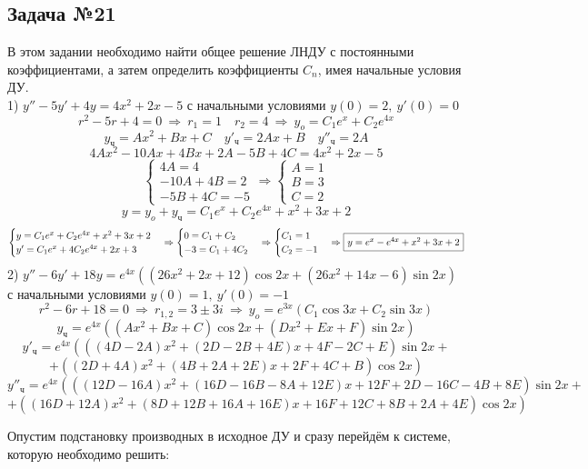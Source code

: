 \documentclass[a3paper,14pt]{extarticle}
\newcommand*\squared[1]{\tikz[baseline=(char.base)]{
            \node[shape=rectangle,draw,inner sep=4pt] (char) {#1};}}
\begin{document}
\subsection*{\centering Задача №21}
В этом задании необходимо найти общее решение ЛНДУ с постоянными коэффициентами, а затем определить коэффициенты $C_n$, имея начальные условия ДУ.\\[1em]
1) $y''-5y'+4y = 4x^2+2x-5$ с начальными условиями $y(0) = 2,\ y'(0) = 0$
$$r^2-5r+4=0 \ \Rightarrow\ r_1=1\quad r_2=4 \ \Rightarrow\ y_o = C_1e^x+C_2e^{4x}$$
$$y_{\text{ч}} = Ax^2+Bx+C\quad y'_{\text{ч}} = 2Ax+B\quad y''_\text{ч} = 2A$$
$$4Ax^2-10Ax+4Bx+2A-5B+4C = 4x^2+2x-5$$
$$\begin{cases}
    4A = 4 \\ -10A+4B = 2 \\ -5B+4C = -5
\end{cases} \Rightarrow \begin{cases}
    A = 1 \\ B = 3 \\ C = 2
\end{cases}$$
$$y = y_o+y_{\text{ч}} = C_1e^x+C_2e^{4x} + x^2+3x+2$$
$$\begin{cases}
    y= C_1e^x+C_2e^{4x} + x^2+3x+2 \\ y' = C_1e^x+4C_2e^{4x} +2x+3
\end{cases} \Rightarrow \begin{cases}
    0 = C_1+C_2 \\ -3 = C_1+4C_2
\end{cases} \Rightarrow \begin{cases}
    C_1 = 1 \\ C_2 = -1
\end{cases} \Rightarrow \squared{$y = e^x-e^{4x}+x^2+3x+2$}$$
2) $y''-6y'+18y = e^{4x}\left( (26x^2+2x+12)\cos{2x}+(26x^2+14x-6)\sin{2x} \right)$ с начальными условиями $y(0) = 1,\ y'(0) = -1$
$$r^2-6r+18=0 \ \Rightarrow\ r_{1,2} = 3\pm 3i \ \Rightarrow\ y_o = e^{3x}(C_1\cos{3x}+C_2\sin{3x})$$
$$y_{\text{ч}} = e^{4x}\left( (Ax^2+Bx+C)\cos{2x} + (Dx^2+Ex+F)\sin{2x} \right)$$
$$y'_{\text{ч}} = {e}^{4x}\left(\left(\left(4D-2A\right){x}^{2}+\left(2D-2B+4E\right)x+4F-2C+E\right)\sin{2x}+\right.$$
$$\left.+\left(\left(2D+4A\right){x}^{2}+\left(4B+2A+2E\right)x+2F+4C+B\right)\cos{2x}\right)$$
$$y''_\text{ч} = {e}^{4x}\left(\left(\left(12D-16A\right){x}^{2}+\left(16D-16B-8A+12E\right)x+12F+2D-16C-4B+8E\right)\sin{2x}+\right.$$
$$\left.+\left(\left(16D+12A\right){x}^{2}+\left(8D+12B+16A+16E\right)x+16F+12C+8B+2A+4E\right)\cos{2x}\right)$$
\centerline{Опустим подстановку производных в исходное ДУ и сразу перейдём к системе, которую необходимо решить:}
\end{document}
